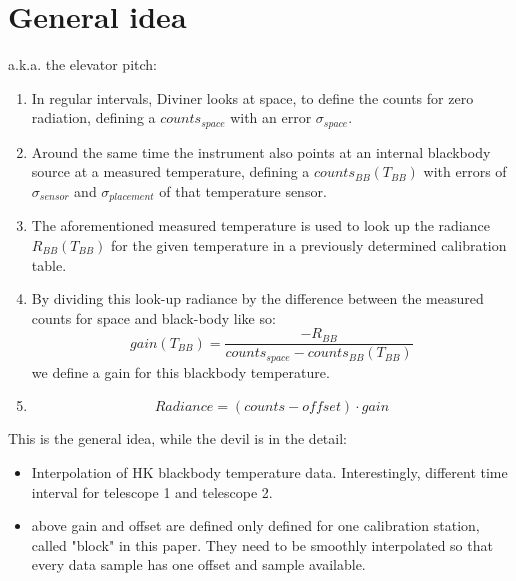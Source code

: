 \section{General idea}
a.k.a. the elevator pitch:

\begin{enumerate}
\item In regular intervals, Diviner looks at space, to define the counts for zero radiation, defining a $counts_{space}$ with an error $\sigma_{space}$. 
\item Around the same time the instrument also points at an internal blackbody source at a measured temperature, defining a $counts_{BB}\left(T_{BB}\right)$ with errors of $\sigma_{sensor}$ and $\sigma_{placement}$ of that temperature sensor.
\item The aforementioned measured temperature is used to look up the radiance $R_{BB}\left(T_{BB}\right)$ for the given temperature in a previously determined calibration table.
\item By dividing this look-up radiance by the difference between the measured counts for space and black-body like so: $$ gain\left(T_{BB}\right) = \frac{-R_{BB}}{counts_{space} - counts_{BB}\left(T_{BB}\right)} $$ we define a gain for this blackbody temperature.
\item $$ Radiance = \left(counts - offset\right) \cdot gain $$
\end{enumerate}

This is the general idea, while the devil is in the detail:
\begin{itemize}
\item Interpolation of HK blackbody temperature data. Interestingly, different time interval for telescope 1 and telescope 2.
\item above gain and offset are defined only defined for one calibration station, called "block" in this paper. They need to be smoothly interpolated so that every data sample has one offset and sample available.
\end{itemize}